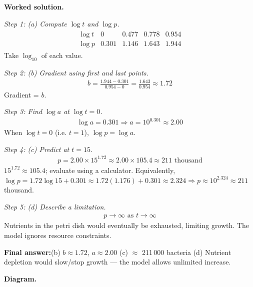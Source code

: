 \documentclass[11pt]{article}
\begin{document}
\textbf{Worked solution.}

\textit{Step 1: (a) Compute \( \log t \) and \( \log p \).}
\[\begin{gathered}
\begin{array}{c|c|c|c|c} \log t & 0 & 0.477 & 0.778 & 0.954 \\ \log p & 0.301 & 1.146 & 1.643 & 1.944 \end{array}
\end{gathered}\]
Take \( \log_{10} \) of each value.

\textit{Step 2: (b) Gradient using first and last points.}
\[\begin{gathered}
b = \frac{1.944 - 0.301}{0.954 - 0} = \frac{1.643}{0.954} \approx 1.72
\end{gathered}\]
Gradient = \( b \).

\textit{Step 3: Find \( \log a \) at \( \log t = 0 \).}
\[\begin{gathered}
\log a = 0.301 \Rightarrow a = 10^{0.301} \approx 2.00
\end{gathered}\]
When \( \log t = 0 \) (i.e. \( t = 1 \)), \( \log p = \log a \).

\textit{Step 4: (c) Predict at \( t = 15 \).}
\[\begin{gathered}
p = 2.00 \times 15^{1.72} \approx 2.00 \times 105.4 \approx 211 \text{ thousand}
\end{gathered}\]
\( 15^{1.72} \approx 105.4 \); evaluate using a calculator. Equivalently, \( \log p = 1.72\log 15 + 0.301 \approx 1.72(1.176) + 0.301 \approx 2.324 \Rightarrow p \approx 10^{2.324} \approx 211 \) thousand.

\textit{Step 5: (d) Describe a limitation.}
\[\begin{gathered}
p \to \infty \text{ as } t \to \infty
\end{gathered}\]
Nutrients in the petri dish would eventually be exhausted, limiting growth. The model ignores resource constraints.

\begin{answerbox}
\textbf{Final answer:}\quad (b) \(\displaystyle  b \approx 1.72 \), \(\displaystyle  a \approx 2.00 \) \quad  (c) $\approx$ 211\,000  bacteria \quad  (d) Nutrient depletion would slow/stop growth --- the model allows unlimited increase.
\end{answerbox}
\textbf{Diagram.}
\end{document}
